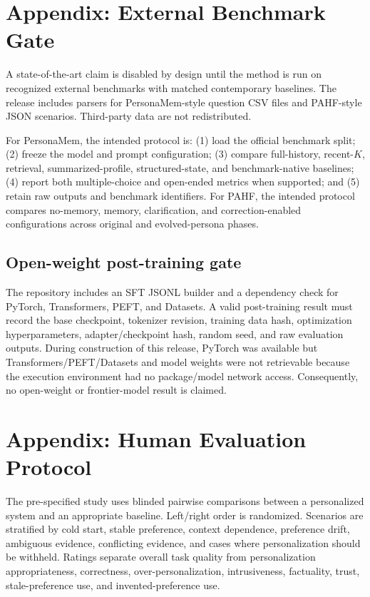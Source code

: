 \documentclass[10pt,twocolumn]{article}
\begin{document}
\section{Appendix: External Benchmark Gate}
A state-of-the-art claim is disabled by design until the method is run on recognized external benchmarks with matched contemporary baselines. The release includes parsers for PersonaMem-style question CSV files and PAHF-style JSON scenarios. Third-party data are not redistributed.

For PersonaMem, the intended protocol is: (1) load the official benchmark split; (2) freeze the model and prompt configuration; (3) compare full-history, recent-$K$, retrieval, summarized-profile, structured-state, and benchmark-native baselines; (4) report both multiple-choice and open-ended metrics when supported; and (5) retain raw outputs and benchmark identifiers. For PAHF, the intended protocol compares no-memory, memory, clarification, and correction-enabled configurations across original and evolved-persona phases.

\subsection{Open-weight post-training gate}
The repository includes an SFT JSONL builder and a dependency check for PyTorch, Transformers, PEFT, and Datasets. A valid post-training result must record the base checkpoint, tokenizer revision, training data hash, optimization hyperparameters, adapter/checkpoint hash, random seed, and raw evaluation outputs. During construction of this release, PyTorch was available but Transformers/PEFT/Datasets and model weights were not retrievable because the execution environment had no package/model network access. Consequently, no open-weight or frontier-model result is claimed.

\section{Appendix: Human Evaluation Protocol}
The pre-specified study uses blinded pairwise comparisons between a personalized system and an appropriate baseline. Left/right order is randomized. Scenarios are stratified by cold start, stable preference, context dependence, preference drift, ambiguous evidence, conflicting evidence, and cases where personalization should be withheld. Ratings separate overall task quality from personalization appropriateness, correctness, over-personalization, intrusiveness, factuality, trust, stale-preference use, and invented-preference use.
\end{document}
